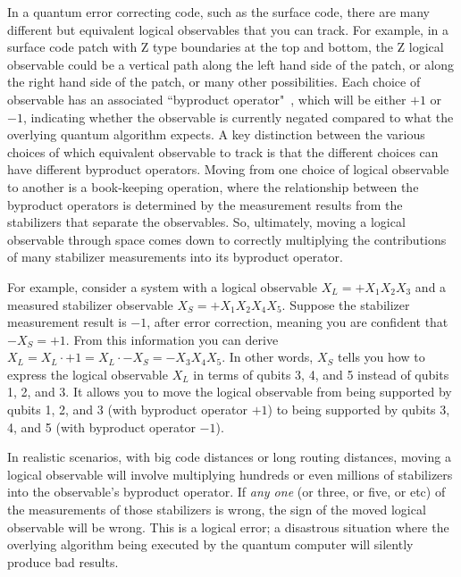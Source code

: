 \documentclass[onecolumn,unpublished,a4paper]{quantumarticle}
\theoremstyle{definition}
\theoremstyle{definition}
\theoremstyle{definition}
\begin{document}
In a quantum error correcting code, such as the surface code, there are many different but equivalent logical observables that you can track.
For example, in a surface code patch with Z type boundaries at the top and bottom, the Z logical observable could be a vertical path along the left hand side of the patch, or along the right hand side of the patch, or many other possibilities.
Each choice of observable has an associated ``byproduct operator"~\cite{fowler2012surfacecodereview}, which will be either $+1$ or $-1$, indicating whether the observable is currently negated compared to what the overlying quantum algorithm expects.
A key distinction between the various choices of which equivalent observable to track is that the different choices can have different byproduct operators.
Moving from one choice of logical observable to another is a book-keeping operation, where the relationship between the byproduct operators is determined by the measurement results from the stabilizers that separate the observables.
So, ultimately, moving a logical observable through space comes down to correctly multiplying the contributions of many stabilizer measurements into its byproduct operator.

For example, consider a system with a logical observable $X_L = +X_1 X_2 X_3$ and a measured stabilizer observable $X_S = +X_1 X_2 X_4 X_5$.
Suppose the stabilizer measurement result is $-1$, after error correction, meaning you are confident that $-X_S = +1$.
From this information you can derive $X_L = X_L \cdot +1 = X_L \cdot -X_S = -X_3X_4 X_5$.
In other words, $X_S$ tells you how to express the logical observable $X_L$ in terms of qubits 3, 4, and 5 instead of qubits 1, 2, and 3.
It allows you to move the logical observable from being supported by qubits 1, 2, and 3 (with byproduct operator $+1$) to being supported by qubits 3, 4, and 5 (with byproduct operator $-1$).

In realistic scenarios, with big code distances or long routing distances, moving a logical observable will involve multiplying hundreds or even millions of stabilizers into the observable's byproduct operator.
If \emph{any one} (or three, or five, or etc) of the measurements of those stabilizers is wrong, the sign of the moved logical observable will be wrong.
This is a logical error; a disastrous situation where the overlying algorithm being executed by the quantum computer will silently produce bad results.
\end{document}
